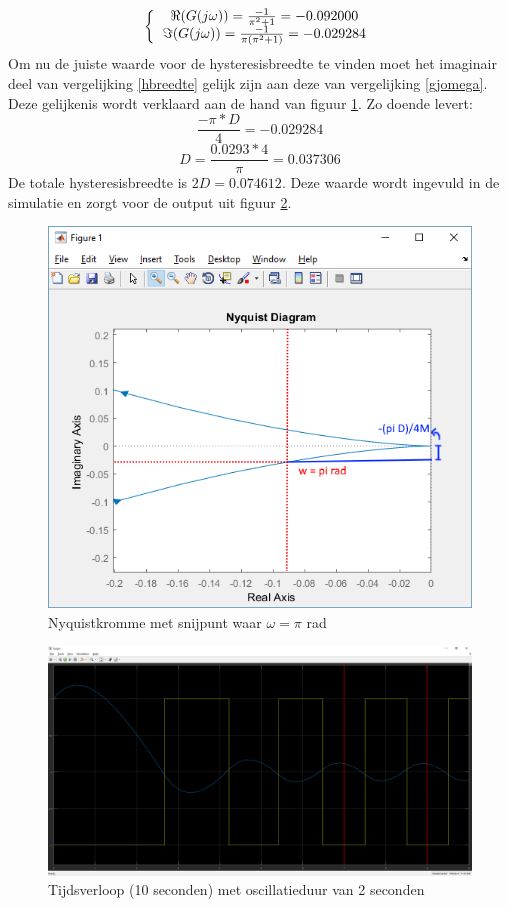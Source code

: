 \documentclass[12pt]{article}
\begin{document}
\[ 
\left \{
  \begin{tabular}{c}
  $\Re(G(j\omega)) = \frac{-1}{\pi^2+1} = -0.092000$ \\
  $\Im(G(j\omega)) = \frac{-1}{\pi(\pi^2+1)} = -0.029284$ \\
  \end{tabular}
\right. 
\]
Om nu de juiste waarde voor de hysteresisbreedte te vinden moet het imaginair deel van vergelijking \ref{hbreedte} gelijk zijn aan deze van vergelijking \ref{gjomega}. Deze gelijkenis wordt verklaard aan de hand van figuur \ref{nyq}. Zo doende levert:
\begin{equation}
	\frac{-\pi * D}{4} = -0.029284
\end{equation}
\begin{equation}
	D = \frac{0.0293*4}{\pi} = 0.037306
\end{equation}
De totale hysteresisbreedte is $2D = 0.074612$. Deze waarde wordt ingevuld in de simulatie en zorgt voor de output uit figuur \ref{output3}.
\begin{figure}
	\centering
	\includegraphics[height=0.4\textheight, keepaspectratio]{nyquist.png}
	\caption{Nyquistkromme met snijpunt waar $\omega = \pi$ rad}
	\label{nyq}
\end{figure}
\begin{figure}[]
	\centering
	\includegraphics[width=\textwidth, keepaspectratio]{output3.png}
	\caption{Tijdsverloop (10 seconden) met oscillatieduur van 2 seconden}
	\label{output3}
\end{figure}
\clearpage
\end{document}
